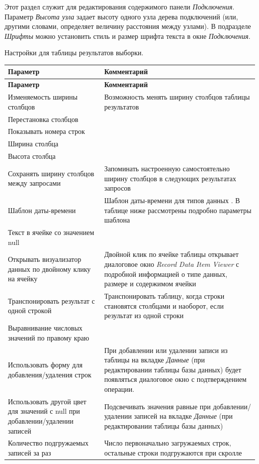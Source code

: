 
Этот раздел служит для редактирования содержимого панели \textit{Подключения}.
Параметр \textit{Высота узла} задает высоту одного узла дерева подключений (или, другими словами, определяет величину расстояния между узлами). В подразделе \textit{Шрифты} можно установить стиль и размер шрифта текста в окне \textit{Подключения}.


Настройки для таблицы результатов выборки.
\hypertarget{tab:datapattern}{}
\begin{longtable}[r]{|>{\ttfamily}m{5cm}|m{10.5cm}|}
	\hline
	\centering\normalfont\bfseries Параметр &
	\centering\arraybslash\bfseries Комментарий\\\hline
	\endfirsthead
	\hline
	\centering\normalfont\bfseries Параметр &
	\centering\arraybslash\bfseries Комментарий\\\hline
	\endhead
	\hline
	Изменяемость ширины столбцов &  Возможность менять ширину столбцов таблицы результатов \\\hline
	Перестановка столбцов & \\\hline
	Показывать номера строк & \\\hline
	Ширина столбца & \\\hline
	Высота столбца &  \\\hline
	Сохранять ширину столбцов между запросами & Запоминать настроенную самостоятельно ширину столбцов в следующих результатах запросов \\\hline
	Шаблон даты-времени & Шаблон даты-времени для типов данных \ttt{DATE,TIME,TIMESTAMP}. В таблице ниже рассмотрены подробно параметры шаблона\\\hline
	Текст в ячейке со значением null &  \\\hline
	Открывать визуализатор данных по двойному клику на ячейку & Двойной клик по ячейке таблицы открывает диалоговое окно \textit{Record Data Item Viewer} с подробной информацией о типе данных, размере и содержимом ячейки \\\hline
	Транспонировать результат с одной строкой & Транспонировать таблицу, когда строки становятся столбцами и наоборот, если результат из одной строки \\\hline
	Выравнивание числовых значений по правому краю &  \\\hline
	Использовать форму для добавления/удаления строк & При добавлении или удалении записи из таблицы на вкладке \textit{Данные} (при редактировании таблицы базы данных) будет появляться диалоговое окно с подтверждением операции. \\\hline
	Использовать другой цвет для значений с null при добавлении/удалении записей & Подсвечивать значения равные \ttt{NULL} при добавлении/удалении записей на вкладке \textit{Данные} (при редактировании таблицы базы данных) \\\hline
	Количество подгружаемых записей за раз & Число первоначально загружаемых строк, остальные строки подгружаются при скролле \\\hline
\end{longtable}

